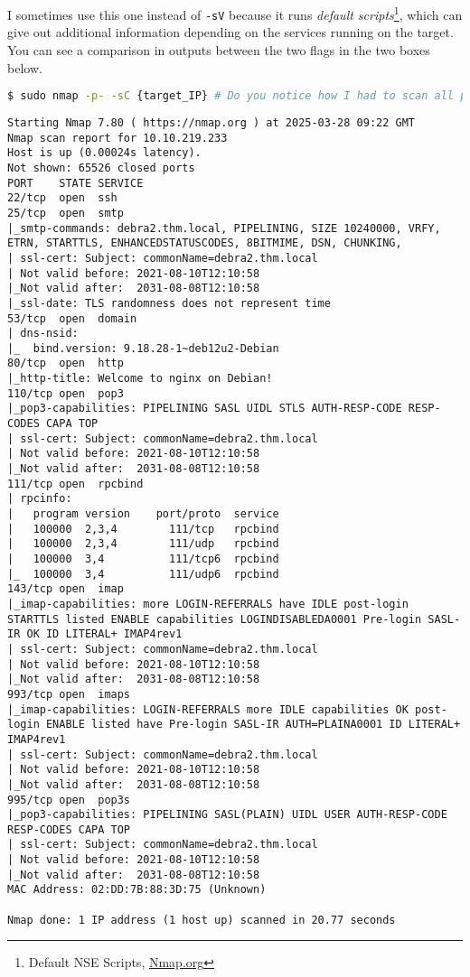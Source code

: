 \documentclass[11pt,a4paper]{article}
\newenvironment{commandbox}[1][]{
    \begin{tcolorbox}[
        colback=kalibackground,   
        colframe=commandcolor,    
        fonttitle=\bfseries\color{white},  
        title=#1,               
        breakable=true           
    ]
}{
    \end{tcolorbox}
}
\begin{document}
I sometimes use this one instead of \texttt{-sV} because it runs \textit{default scripts}\footnote{Default NSE Scripts, \href{https://nmap.org/nsedoc/categories/default.html}{Nmap.org}}, which can give out additional information depending on the services running on the target. You can see a comparison in outputs between the two flags in the two boxes below.
\begin{commandbox}[Default Script Scan]
\begin{lstlisting}[language=bash, style=bash, basicstyle=\scriptsize\ttfamily\color{warningcolor}, breaklines=true, breakindent=0pt]
$ sudo nmap -p- -sC {target_IP} # Do you notice how I had to scan all ports, not just the top 1000 most common?
\end{lstlisting}

\begin{lstlisting}[basicstyle=\scriptsize\ttfamily\color{kalitext}]
Starting Nmap 7.80 ( https://nmap.org ) at 2025-03-28 09:22 GMT
Nmap scan report for 10.10.219.233
Host is up (0.00024s latency).
Not shown: 65526 closed ports
PORT    STATE SERVICE
22/tcp  open  ssh
25/tcp  open  smtp
|_smtp-commands: debra2.thm.local, PIPELINING, SIZE 10240000, VRFY, ETRN, STARTTLS, ENHANCEDSTATUSCODES, 8BITMIME, DSN, CHUNKING, 
| ssl-cert: Subject: commonName=debra2.thm.local
| Not valid before: 2021-08-10T12:10:58
|_Not valid after:  2031-08-08T12:10:58
|_ssl-date: TLS randomness does not represent time
53/tcp  open  domain
| dns-nsid: 
|_  bind.version: 9.18.28-1~deb12u2-Debian
80/tcp  open  http
|_http-title: Welcome to nginx on Debian!
110/tcp open  pop3
|_pop3-capabilities: PIPELINING SASL UIDL STLS AUTH-RESP-CODE RESP-CODES CAPA TOP
| ssl-cert: Subject: commonName=debra2.thm.local
| Not valid before: 2021-08-10T12:10:58
|_Not valid after:  2031-08-08T12:10:58
111/tcp open  rpcbind
| rpcinfo: 
|   program version    port/proto  service
|   100000  2,3,4        111/tcp   rpcbind
|   100000  2,3,4        111/udp   rpcbind
|   100000  3,4          111/tcp6  rpcbind
|_  100000  3,4          111/udp6  rpcbind
143/tcp open  imap
|_imap-capabilities: more LOGIN-REFERRALS have IDLE post-login STARTTLS listed ENABLE capabilities LOGINDISABLEDA0001 Pre-login SASL-IR OK ID LITERAL+ IMAP4rev1
| ssl-cert: Subject: commonName=debra2.thm.local
| Not valid before: 2021-08-10T12:10:58
|_Not valid after:  2031-08-08T12:10:58
993/tcp open  imaps
|_imap-capabilities: LOGIN-REFERRALS more IDLE capabilities OK post-login ENABLE listed have Pre-login SASL-IR AUTH=PLAINA0001 ID LITERAL+ IMAP4rev1
| ssl-cert: Subject: commonName=debra2.thm.local
| Not valid before: 2021-08-10T12:10:58
|_Not valid after:  2031-08-08T12:10:58
995/tcp open  pop3s
|_pop3-capabilities: PIPELINING SASL(PLAIN) UIDL USER AUTH-RESP-CODE RESP-CODES CAPA TOP
| ssl-cert: Subject: commonName=debra2.thm.local
| Not valid before: 2021-08-10T12:10:58
|_Not valid after:  2031-08-08T12:10:58
MAC Address: 02:DD:7B:88:3D:75 (Unknown)

Nmap done: 1 IP address (1 host up) scanned in 20.77 seconds
\end{lstlisting}
\end{commandbox}
\end{document}
